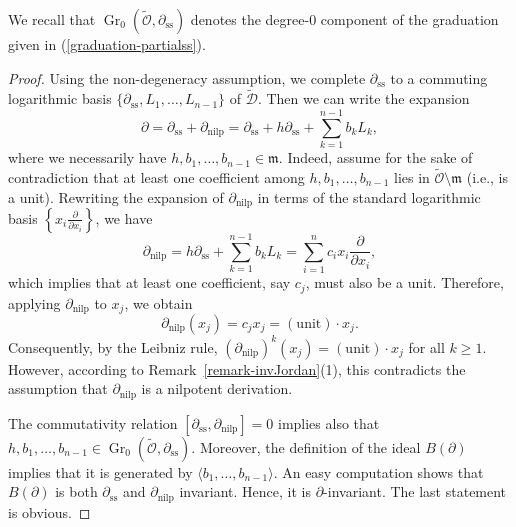 \documentclass[10pt,twoside,reqno]{amsart}
\theoremstyle{remark}
\theoremstyle{remark}
\newcommand{\tmop}[1]{{\operatorname{#1}}}
\newcommand{\tO}{\widetilde{\mathcal{O}}}
\newcommand{\cD}{\mathcal{D}}
\newcommand{\tcD}{\widetilde{\cD}}
\begin{document}
\noindent We recall that $\tmop{Gr}_0 \left( \tO, \partial_{\tmop{ss}}
  \right)$ denotes the degree-0 component of the graduation given in (\ref{graduation-partialss}).
\begin{proof} 
  Using the non-degeneracy assumption, we complete $\partial_{\tmop{ss}}$ to a commuting logarithmic basis $\{
  \partial_{\tmop{ss}}, L_1, \ldots, L_{n - 1} \}$ of $\tcD$. Then we can
  write the expansion
  \[ \partial = \partial_{\tmop{ss}} + \partial_{\tmop{nilp}} =
     \partial_{\tmop{ss}} + h \partial_{\tmop{ss}} + \sum_{k = 1}^{n - 1} b_k
     L_k, \]
  where we necessarily have $h, b_1, \ldots, b_{n - 1} \in \mathfrak{m}$.  Indeed, assume for the sake of contradiction that at least one coefficient among $h, b_1, \dots, b_{n - 1}$ lies in $\tO \setminus \mathfrak{m}$ (i.e., is a unit). Rewriting the expansion of $\partial_{\tmop{nilp}}$ in terms of the standard logarithmic basis $\left\{x_i \frac{\partial}{\partial x_i}\right\}$, we have
$$
\partial_{\tmop{nilp}} = h \partial_{\tmop{ss}} + \sum_{k = 1}^{n - 1} b_k L_k = \sum_{i = 1}^{n} c_i x_i \frac{\partial}{\partial x_i},
$$
which implies that at least one coefficient, say $c_j$, must also be a unit. Therefore, applying $\partial_{\tmop{nilp}}$ to $x_j$, we obtain
$$
\partial_{\tmop{nilp}}(x_j) = c_j x_j = (\text{unit}) \cdot x_j.
$$
Consequently, by the Leibniz rule, $(\partial_{\tmop{nilp}})^k(x_j) = (\text{unit}) \cdot x_j$ for all $k \ge 1$. However, according to Remark~\ref{remark-invJordan}(1), this contradicts the assumption that $\partial_{\tmop{nilp}}$ is a nilpotent derivation.
  
 The commutativity
  relation $[\partial_{\tmop{ss}}, \partial_{\tmop{nilp}}] = 0$ implies also that
  $h, b_1, \ldots, b_{n - 1} \in \tmop{Gr}_0 \left( \tO,
  \partial_{\tmop{ss}} \right)$. Moreover, the definition of the ideal $B (\partial)$
  implies that it is generated by $\langle b_1, \ldots, b_{n - 1} \rangle$. An
  easy computation shows that $B (\partial)$ is both $\partial_{\tmop{ss}}$
  and $\partial_{\tmop{nilp}}$ invariant. Hence, it is $\partial$-invariant.
  The last statement is obvious.
\end{proof}
\end{document}
